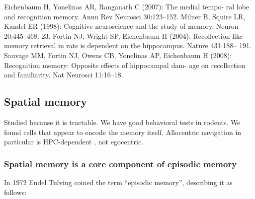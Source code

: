 
Eichenbaum H, Yonelinas AR, Ranganath C (2007): The medial tempo- ral lobe and recognition memory. Annu Rev Neurosci 30:123–152.
Milner B, Squire LR, Kandel ER (1998): Cognitive neuroscience and the study of memory. Neuron 20:445–468.
23.
Fortin NJ, Wright SP, Eichenbaum H (2004): Recollection-like memory retrieval in rats is dependent on the hippocampus. Nature 431:188– 191.
Sauvage MM, Fortin NJ, Owens CB, Yonelinas AP, Eichenbaum H (2008): Recognition memory: Opposite effects of hippocampal dam- age on recollection and familiarity. Nat Neurosci 11:16–18.

\subsection{Spatial memory}\label{sec:intro:hpc:spatial}
Studied because it is tractable.
We have good behavioral tests in rodents.
We found cells that appear to encode the memory itself.
Allocentric navigation in particular is HPC-dependent \citep{OKeefe1978, Smith1989}, not egocentric.

\subsubsection{Spatial memory is a core component of episodic memory}\label{sec:intro:hpc:spatial-episodic}
In 1972 Endel Tulving coined the term ``episodic memory'', describing it as follows:

